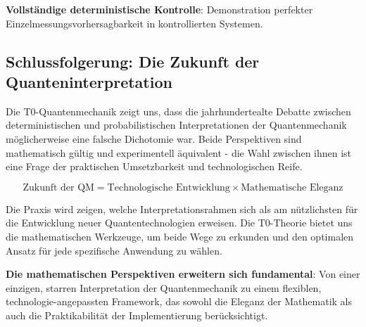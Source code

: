 \documentclass[12pt,a4paper]{article}
\theoremstyle{definition}
\theoremstyle{remark}
\begin{document}
\textbf{Vollständige deterministische Kontrolle}:
Demonstration perfekter Einzelmessungsvorhersagbarkeit in kontrollierten Systemen.

\subsection{Schlussfolgerung: Die Zukunft der Quanteninterpretation}

Die T0-Quantenmechanik zeigt uns, dass die jahrhundertealte Debatte zwischen deterministischen und probabilistischen Interpretationen der Quantenmechanik möglicherweise eine falsche Dichotomie war. Beide Perspektiven sind mathematisch gültig und experimentell äquivalent - die Wahl zwischen ihnen ist eine Frage der praktischen Umsetzbarkeit und technologischen Reife.

\begin{equation}
	\boxed{\text{Zukunft der QM} = \text{Technologische Entwicklung} \times \text{Mathematische Eleganz}}
\end{equation}

Die Praxis wird zeigen, welche Interpretationsrahmen sich als am nützlichsten für die Entwicklung neuer Quantentechnologien erweisen. Die T0-Theorie bietet uns die mathematischen Werkzeuge, um beide Wege zu erkunden und den optimalen Ansatz für jede spezifische Anwendung zu wählen.

\textbf{Die mathematischen Perspektiven erweitern sich fundamental}: Von einer einzigen, starren Interpretation der Quantenmechanik zu einem flexiblen, technologie-angepassten Framework, das sowohl die Eleganz der Mathematik als auch die Praktikabilität der Implementierung berücksichtigt.
\end{document}
